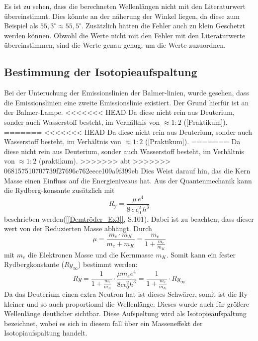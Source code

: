 Es ist zu sehen, dass die berechneten Wellenlängen nicht mit den Literaturwert übereinstimmt. 
Dies könnte an der näherung der Winkel liegen, da diese zum Beispiel als $55,3^\circ \approx 55,5^\circ$.
Zusätzlich hätten die Fehler auch zu klein Geschetzt werden können.
Obwohl die Werte nicht mit den Fehler mit den Literaturwerte übereinstimmen, sind die Werte genau genug, um die Werte zuzuordnen. 


\subsection{Bestimmung der Isotopieaufspaltung}

Bei der Unteruchung der Emissionslinien der Balmer-linien, wurde gesehen, dass die Emissionslinien eine zweite Emissionslinie existiert.
Der Grund hierfür ist an der Balmer-Lampe. 
<<<<<<< HEAD
Da diese nicht rein aus Deuterium, sonder auch Wasserstoff besteht, im Verhältnis von $\approx 1 : 2$ ([Praktikum]). 
=======
<<<<<<< HEAD
Da diese nicht rein aus Deuterium, sonder auch Wasserstoff besteht, im Verhältnis von $\approx 1 : 2$ ([Praktikum]). 
=======
Da diese nicht rein aus Deuterium, sonder auch Wasserstoff besteht, im Verhältnis von $\approx 1 : 2$ (praktikum). 
>>>>>>> abt
>>>>>>> 068157510707739f27696c762eece109a9f399eb
Dies Weist darauf hin, das die Kern Masse einen Einfluss auf die Energieniveaus hat. 
Aus der Quantenmechanik kann die Rydberg-konsante zusätzlich mit 
\begin{equation}
  R_{\mathrm{y}} = \frac{\mu\,e^4}{8\,c\,\epsilon_0^2\,h^3}
\end{equation}
beschrieben werden(\cref{[Demtröder_Ex3]}, S.101). Dabei ist zu beachten, dass dieser wert von der Reduzierten Masse abhängt.
Durch 
\begin{equation}
    \mu = \frac{m_e \cdot m_K}{m_e + m_K} = \frac{m_e}{1+\frac{m_e}{m_K}}
\end{equation}
mit $m_e$ die Elektronen Masse und die Kernmasse $m_K$.
Somit kann ein fester Rydbergkonstante ($Ry_\infty$) bestimmt werden: 
\begin{equation}
    Ry = \frac{1}{1+\frac{m_e}{m_K}}\cdot \frac{\mu m_e e^4}{8c \epsilon_0^2h^3} = \frac{1}{1 + \frac{m_e}{m_K}}\cdot Ry_\infty
\end{equation}
Da das Deuterium einen extra Neutron hat ist dieses Schwärer, somit ist die Ry kleiner und so auch proportional die Wellenlänge. 
Dieses wurde auch für größere Wellenlänge deutlicher sichtbar.
Diese Aufspeltung wird als Isotopieaufspaltung bezeichnet, wobei es sich in diesem fall über ein Masseneffekt der Isotopiaufspaltung handelt.


